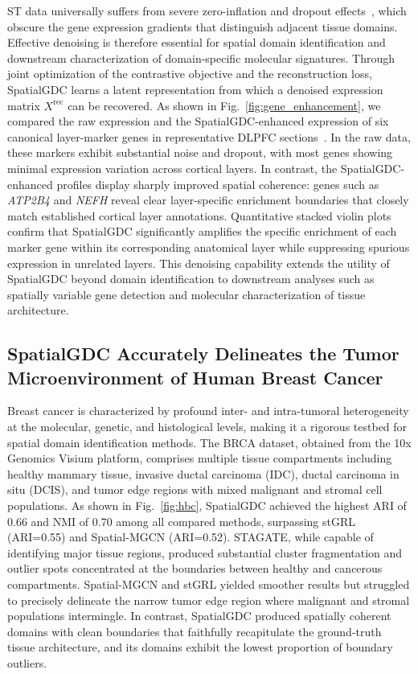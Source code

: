 \documentclass[lettersize,journal]{IEEEtran}
\begin{document}
ST data universally suffers from severe zero-inflation and dropout effects~\cite{qiu2020embracing}, which obscure the gene expression gradients that distinguish adjacent tissue domains. Effective denoising is therefore essential for spatial domain identification and downstream characterization of domain-specific molecular signatures. Through joint optimization of the contrastive objective and the reconstruction loss, SpatialGDC learns a latent representation from which a denoised expression matrix $X^{\text{rec}}$ can be recovered. As shown in Fig.~\ref{fig:gene_enhancement}, we compared the raw expression and the SpatialGDC-enhanced expression of six canonical layer-marker genes in representative DLPFC sections~\cite{zeng2012large}. In the raw data, these markers exhibit substantial noise and dropout, with most genes showing minimal expression variation across cortical layers. In contrast, the SpatialGDC-enhanced profiles display sharply improved spatial coherence: genes such as \textit{ATP2B4} and \textit{NEFH} reveal clear layer-specific enrichment boundaries that closely match established cortical layer annotations. Quantitative stacked violin plots confirm that SpatialGDC significantly amplifies the specific enrichment of each marker gene within its corresponding anatomical layer while suppressing spurious expression in unrelated layers. This denoising capability extends the utility of SpatialGDC beyond domain identification to downstream analyses such as spatially variable gene detection and molecular characterization of tissue architecture.

\subsection{SpatialGDC Accurately Delineates the Tumor Microenvironment of Human Breast Cancer}

Breast cancer is characterized by profound inter- and intra-tumoral heterogeneity at the molecular, genetic, and histological levels, making it a rigorous testbed for spatial domain identification methods. The BRCA dataset, obtained from the 10x Genomics Visium platform, comprises multiple tissue compartments including healthy mammary tissue, invasive ductal carcinoma (IDC), ductal carcinoma in situ (DCIS), and tumor edge regions with mixed malignant and stromal cell populations. As shown in Fig.~\ref{fig:hbc}, SpatialGDC achieved the highest ARI of 0.66 and NMI of 0.70 among all compared methods, surpassing stGRL (ARI=0.55) and Spatial-MGCN (ARI=0.52). STAGATE, while capable of identifying major tissue regions, produced substantial cluster fragmentation and outlier spots concentrated at the boundaries between healthy and cancerous compartments. Spatial-MGCN and stGRL yielded smoother results but struggled to precisely delineate the narrow tumor edge region where malignant and stromal populations intermingle. In contrast, SpatialGDC produced spatially coherent domains with clean boundaries that faithfully recapitulate the ground-truth tissue architecture, and its domains exhibit the lowest proportion of boundary outliers.
\end{document}
